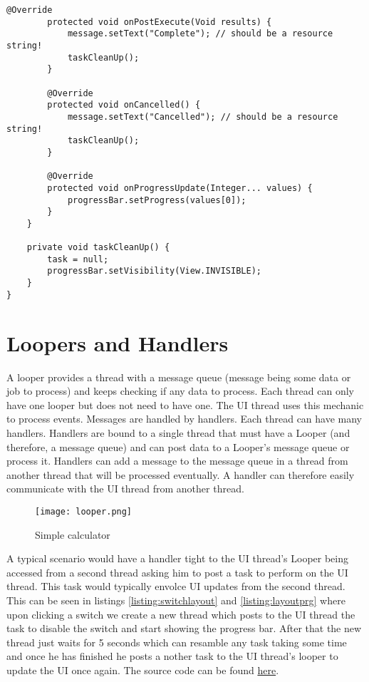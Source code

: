 \begin{lstlisting}[style=A_Java, caption={Background task done with asynchronous task}, label={listing:asyncprog}]
        @Override
        protected void onPostExecute(Void results) {
            message.setText("Complete"); // should be a resource string!
            taskCleanUp();
        }

        @Override
        protected void onCancelled() {
            message.setText("Cancelled"); // should be a resource string!
            taskCleanUp();
        }

        @Override
        protected void onProgressUpdate(Integer... values) {
            progressBar.setProgress(values[0]);
        }
    }

    private void taskCleanUp() {
        task = null;
        progressBar.setVisibility(View.INVISIBLE);
    }
}
\end{lstlisting}


\section{Loopers and Handlers}
A looper provides a thread with a message queue (message being some data or job to process) and keeps checking if any data to process. Each thread can only have one looper but does not need to have one. The UI thread uses this mechanic to process events. Messages are handled by handlers. Each thread can have many handlers. Handlers are bound to a single thread that must have a Looper (and therefore, a message queue) and can post data to a Looper's message queue or process it. Handlers can add a message to the message queue in a thread from another thread that will be processed eventually. A handler can therefore easily communicate with the UI thread from another thread.

\begin{figure}[H]
\centering
\texttt{[image: looper.png]}
\caption{Simple calculator}
\label{fig:simcal}
\end{figure}

A typical scenario would have a handler tight to the UI thread's Looper being accessed from a second thread asking him to post a task to perform on the UI thread. This task would typically envolce UI updates from the second thread. This can be seen in listings \ref{listing:switchlayout} and \ref{listing:layoutprg} where upon clicking a switch we create a new thread which posts to the UI thread the task to disable the switch and start showing the progress bar. After that the new thread just waits for 5 seconds which can resamble any task taking some time and once he has finished he posts a nother task to the UI thread's looper to update the UI once again. The source code can be found \href{https://github.com/JonSteinn/AndroidDevelopment/tree/master/examples/lab2/handlers}{here}.

